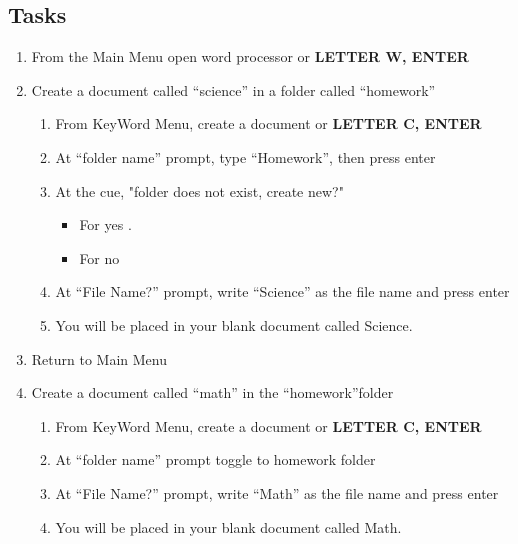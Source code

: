\documentclass[10pt,letterpaper,twoside]{report}
\begin{document}
{{{\subsection{Tasks}
\begin{enumerate}
	\item From the Main Menu open word processor   or {\textcolor{accent}{\MakeUppercase{\textbf{letter w, enter}}}}
	\item Create a document called ``science'' in a folder called ``homework''
	    \begin{enumerate}
	\item From KeyWord Menu, create a document  or {\textcolor{accent}{\MakeUppercase{\textbf{letter c, enter}}}} 
	\item At ``folder name'' prompt, type ``Homework'', then press enter 
    \item At the cue, "folder does not exist, create new?" 
    	\begin{itemize}
    	\item For yes .  \item For no 
	    \end{itemize}
	\item At ``File Name?'' prompt, write ``Science'' as the file name and press enter
	\item You will be placed in your blank document called Science.
	\end{enumerate}
	\item Return to Main Menu 
	\item Create a document called ``math'' in the ``homework''folder
	    \begin{enumerate}
	\item From KeyWord Menu, create a document  or {\textcolor{accent}{\MakeUppercase{\textbf{letter c, enter}}}} 
	\item At ``folder name'' prompt toggle to homework folder 
	\item At ``File Name?'' prompt, write ``Math'' as the file name and press enter
	\item You will be placed in your blank document called Math.

\end{enumerate}
\end{enumerate}}}}
\end{document}
